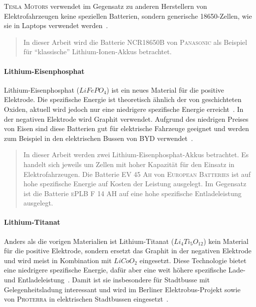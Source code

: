 \textsc{Tesla Motors} verwendet im Gegensatz zu anderen Herstellern von Elektrofahrzeugen keine speziellen Batterien, sondern generische 18650-Zellen, wie sie in Laptops verwendet werden~\cite{teslaBatReport}.

\begin{quote}
	In dieser Arbeit wird die Batterie \textsc{NCR18650B} von \textsc{Panasonic} als Beispiel für "`klassische"' Lithium-Ionen-Akkus betrachtet.
\end{quote}

\paragraph{Lithium-Eisenphosphat}
Lithium-Eisenphosphat ($LiFePO_4$) ist ein neues Material für die positive Elektrode. Die spezifische Energie ist theoretisch ähnlich der von geschichteten Oxiden, aktuell wird jedoch nur eine niedrigere spezifische Energie erreicht~\cite{Tie201382}. In der negativen Elektrode wird Graphit verwendet. Aufgrund des niedrigen Preises von Eisen sind diese Batterien gut für elektrische Fahrzeuge geeignet und werden zum Beispiel in den elektrischen Bussen von \textsc{BYD} verwendet~\cite{bydSpecs}.

\begin{quote}
	In dieser Arbeit werden zwei Lithium-Eisenphosphat-Akkus betrachtet. Es handelt sich jeweils um Zellen mit hoher Kapazität für den Einsatz in Elektrofahrzeugen. Die Batterie \textsc{EV 45 Ah} von \textsc{European Batteries} ist auf hohe spezifische Energie auf Kosten der Leistung ausgelegt. Im Gegensatz ist die Batterie \textsc{ePLB F 14 AH} auf eine hohe spezifische Entladeleistung ausgelegt.
\end{quote}

\paragraph{Lithium-Titanat}
Anders als die vorigen Materialien ist Lithium-Titanat ($Li_4Ti_5O_{12}$) kein Material für die positive Elektrode, sondern ersetzt das Graphit in der negativen Elektrode und wird meist in Kombination mit $LiCoO_2$ eingesetzt. Diese Technologie bietet eine niedrigere spezifische Energie, dafür aber eine weit höhere spezifische Lade- und Entladeleistung~\cite{veneri2012charging}. Damit ist sie insbesondere für Stadtbusse mit Gelegenheitsladung interessant und wird im Berliner Elektrobus-Projekt sowie von \textsc{Proterra} in elektrischen Stadtbussen eingesetzt~\cite{protCat}.

